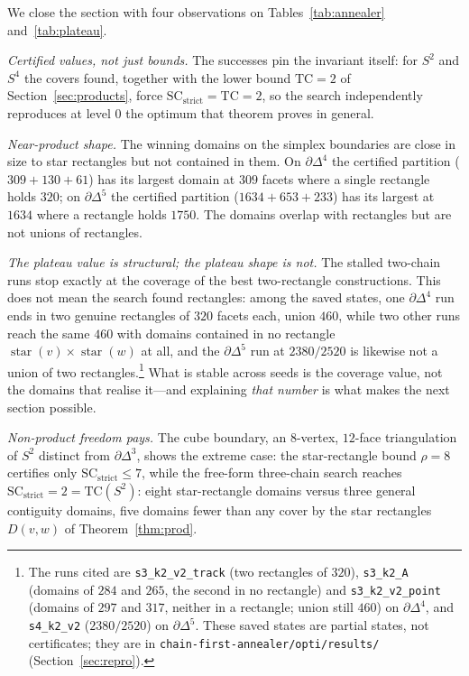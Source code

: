 \documentclass[12pt]{article}
\newcommand{\TC}{\mathrm{TC}}
\newcommand{\SC}{\mathrm{SC}}
\newcommand{\SCst}{\SC_{\mathrm{strict}}}
\begin{document}
We close the section with four observations on
Tables~\ref{tab:annealer} and~\ref{tab:plateau}.

\emph{Certified values, not just bounds.}  The successes pin the
invariant itself: for $S^2$ and $S^4$ the covers found, together with
the lower bound $\TC=2$ of Section~\ref{sec:products}, force
$\SCst=\TC=2$, so the search independently reproduces at level $0$ the
optimum that theorem proves in general.

\emph{Near-product shape.}  The winning domains on the simplex
boundaries are close in size to star rectangles but not contained in
them.  On $\partial\Delta^4$ the certified partition ($309+130+61$) has
its largest domain at $309$ facets where a single rectangle holds $320$;
on $\partial\Delta^5$ the certified partition ($1634+653+233$) has its
largest at $1634$ where a rectangle holds $1750$.  The domains overlap
with rectangles but are not unions of rectangles.

\emph{The plateau value is structural; the plateau shape is not.}
The stalled two-chain runs stop exactly at the coverage of the best
two-rectangle constructions.  This does not mean the search found
rectangles: among the saved states, one $\partial\Delta^4$ run ends in
two genuine rectangles of $320$ facets each, union $460$, while two
other runs reach the same $460$ with domains contained in no rectangle
$\operatorname{star}(v)\times\operatorname{star}(w)$ at all, and the
$\partial\Delta^5$ run at $2380/2520$ is likewise not a union of two
rectangles.\footnote{The runs cited are \texttt{s3\_k2\_v2\_track}
(two rectangles of $320$), \texttt{s3\_k2\_A} (domains of $284$ and
$265$, the second in no rectangle) and \texttt{s3\_k2\_v2\_point}
(domains of $297$ and $317$, neither in a rectangle; union still
$460$) on $\partial\Delta^4$, and \texttt{s4\_k2\_v2} ($2380/2520$)
on $\partial\Delta^5$.  These saved states are partial states, not
certificates; they are in \texttt{chain-first-annealer/opti/results/}
(Section~\ref{sec:repro}).}  What is stable across seeds is the coverage
value, not the domains that realise it---and explaining \emph{that
number} is what makes the next section possible.

\emph{Non-product freedom pays.}  The cube boundary, an $8$-vertex,
$12$-face triangulation of $S^2$ distinct from $\partial\Delta^3$,
shows the extreme case: the star-rectangle bound $\rho=8$ certifies
only $\SCst\le7$, while the free-form three-chain search reaches
$\SCst=2=\TC(S^2)$: eight star-rectangle domains versus three
general contiguity domains, five domains fewer than any cover by the
star rectangles $D(v,w)$ of Theorem~\ref{thm:prod}.
\end{document}
